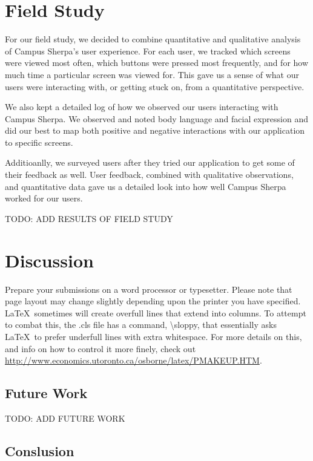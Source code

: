 \documentclass{sigchi}
\begin{document}
\section{Field Study}

For our field study, we decided to combine quantitative and qualitative analysis of Campus Sherpa's user experience. For each user, we tracked which screens were viewed most often, which buttons were pressed most frequently, and for how much time a particular screen was viewed for. This gave us a sense of what our users were interacting with, or getting stuck on, from a quantitative perspective.

We also kept a detailed log of how we observed our users interacting with Campus Sherpa. We observed and noted body language and facial expression and did our best to map both positive and negative interactions with our application to specific screens.

Additioanlly, we surveyed users after they tried our application to get some of their feedback as well. User feedback, combined with qualitative observations, and quantitative data gave us a detailed look into how well Campus Sherpa worked for our users.


TODO: ADD RESULTS OF FIELD STUDY

\section{Discussion}

Prepare your submissions on a word processor or typesetter.  Please
note that page layout may change slightly depending upon the printer
you have specified.  \LaTeX\ sometimes will create overfull lines
that extend into columns.  To attempt to combat this, the .cls
file has a command, {\textbackslash}sloppy, that essentially asks
\LaTeX\ to prefer underfull lines with extra whitespace.  For more
details on this, and info on how to control it more finely, check out
{\url{http://www.economics.utoronto.ca/osborne/latex/PMAKEUP.HTM}}.

\subsection{Future Work}

TODO: ADD FUTURE WORK

\subsection{Conslusion}
\end{document}
